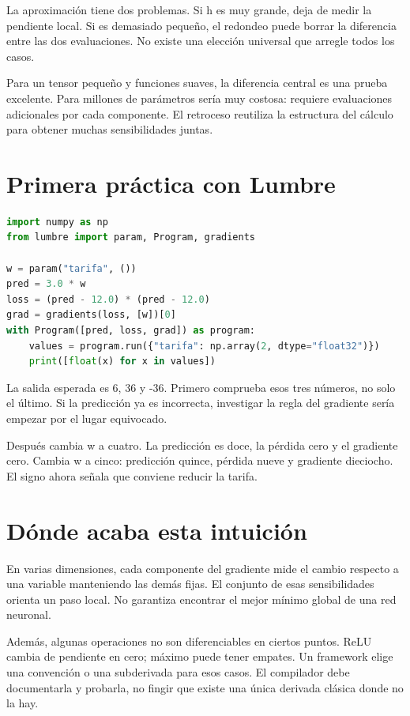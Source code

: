 \documentclass[12pt,a4paper,oneside]{report}
\begin{document}
La aproximación tiene dos problemas. Si h es muy grande, deja de medir la pendiente local. Si es demasiado pequeño, el redondeo puede borrar la diferencia entre las dos evaluaciones. No existe una elección universal que arregle todos los casos.

Para un tensor pequeño y funciones suaves, la diferencia central es una prueba excelente. Para millones de parámetros sería muy costosa: requiere evaluaciones adicionales por cada componente. El retroceso reutiliza la estructura del cálculo para obtener muchas sensibilidades juntas.

\section{Primera práctica con Lumbre}
\begin{lstlisting}[language=Python]
import numpy as np
from lumbre import param, Program, gradients

w = param("tarifa", ())
pred = 3.0 * w
loss = (pred - 12.0) * (pred - 12.0)
grad = gradients(loss, [w])[0]
with Program([pred, loss, grad]) as program:
    values = program.run({"tarifa": np.array(2, dtype="float32")})
    print([float(x) for x in values])
\end{lstlisting}
La salida esperada es 6, 36 y -36. Primero comprueba esos tres números, no solo el último. Si la predicción ya es incorrecta, investigar la regla del gradiente sería empezar por el lugar equivocado.

Después cambia w a cuatro. La predicción es doce, la pérdida cero y el gradiente cero. Cambia w a cinco: predicción quince, pérdida nueve y gradiente dieciocho. El signo ahora señala que conviene reducir la tarifa.

\section{Dónde acaba esta intuición}
En varias dimensiones, cada componente del gradiente mide el cambio respecto a una variable manteniendo las demás fijas. El conjunto de esas sensibilidades orienta un paso local. No garantiza encontrar el mejor mínimo global de una red neuronal.

Además, algunas operaciones no son diferenciables en ciertos puntos. ReLU cambia de pendiente en cero; máximo puede tener empates. Un framework elige una convención o una subderivada para esos casos. El compilador debe documentarla y probarla, no fingir que existe una única derivada clásica donde no la hay.
\end{document}
